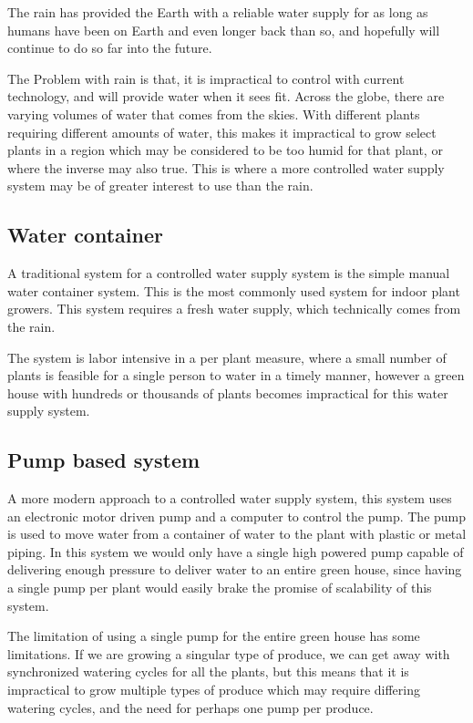 \documentclass[a4paper,12pt,twoside,openright,titlepage]{book}
\begin{document}
The rain has provided the Earth with a reliable water supply for as long as humans have been on Earth and even longer back than so, and hopefully will continue to do so far into the future.

The Problem with rain is that, it is impractical to control with current technology, and will provide water when it sees fit.
Across the globe, there are varying volumes of water that comes from the skies. With different plants requiring different amounts of water, this makes it impractical to grow select plants in a region which may be considered to be too humid for that plant, or where the inverse may also true. This is where a more controlled water supply system may be of greater interest to use than the rain.

\subsection{Water container}
A traditional system for a controlled water supply system is the simple manual water container system.
This is the most commonly used system for indoor plant growers. This system requires a fresh water supply, which technically comes from the rain.

The system is labor intensive in a per plant measure, where a small number of plants is feasible for a single person to water in a timely manner, however a green house with hundreds or thousands of plants becomes impractical for this water supply system.

\subsection{Pump based system}
A more modern approach to a controlled water supply system, this system uses an electronic motor driven pump and a computer to control the pump. The pump is used to move water from a container of water to the plant with plastic or metal piping. In this system we would only have a single high powered pump capable of delivering enough pressure to deliver water to an entire green house, since having a single pump per plant would easily brake the promise of scalability of this system.

The limitation of using a single pump for the entire green house has some limitations.
If we are growing a singular type of produce, we can get away with synchronized watering cycles for all the plants, but this means that it is impractical to grow multiple types of produce which may require differing watering cycles, and the need for perhaps one pump per produce.
\end{document}
